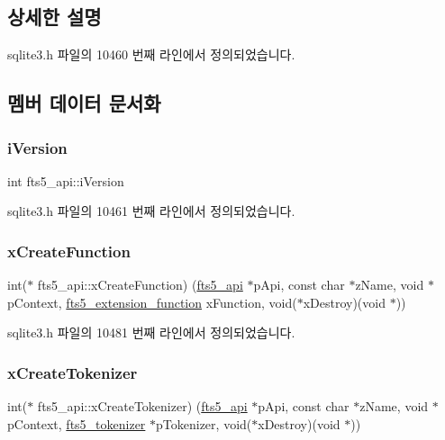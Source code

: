 \subsection{상세한 설명}


sqlite3.\+h 파일의 10460 번째 라인에서 정의되었습니다.



\subsection{멤버 데이터 문서화}
\mbox{\label{structfts5__api_a3c338289abb33e1805da870172956a7c}} 
\subsubsection{\texorpdfstring{i\+Version}{iVersion}}
{\footnotesize\ttfamily int fts5\+\_\+api\+::i\+Version}



sqlite3.\+h 파일의 10461 번째 라인에서 정의되었습니다.

\mbox{\label{structfts5__api_acf1a0612be3b91b908f38ecbc6735d17}} 
\subsubsection{\texorpdfstring{x\+Create\+Function}{xCreateFunction}}
{\footnotesize\ttfamily int($\ast$ fts5\+\_\+api\+::x\+Create\+Function) (\hyperlink{structfts5__api}{fts5\+\_\+api} $\ast$p\+Api, const char $\ast$z\+Name, void $\ast$p\+Context, \hyperlink{sqlite3_8h_a8a1df7b5a066b194f490be5936e85c17}{fts5\+\_\+extension\+\_\+function} x\+Function, void($\ast$x\+Destroy)(void $\ast$))}



sqlite3.\+h 파일의 10481 번째 라인에서 정의되었습니다.

\mbox{\label{structfts5__api_a7fe3663f85eab512d5c461e1674da129}} 
\subsubsection{\texorpdfstring{x\+Create\+Tokenizer}{xCreateTokenizer}}
{\footnotesize\ttfamily int($\ast$ fts5\+\_\+api\+::x\+Create\+Tokenizer) (\hyperlink{structfts5__api}{fts5\+\_\+api} $\ast$p\+Api, const char $\ast$z\+Name, void $\ast$p\+Context, \hyperlink{structfts5__tokenizer}{fts5\+\_\+tokenizer} $\ast$p\+Tokenizer, void($\ast$x\+Destroy)(void $\ast$))}



